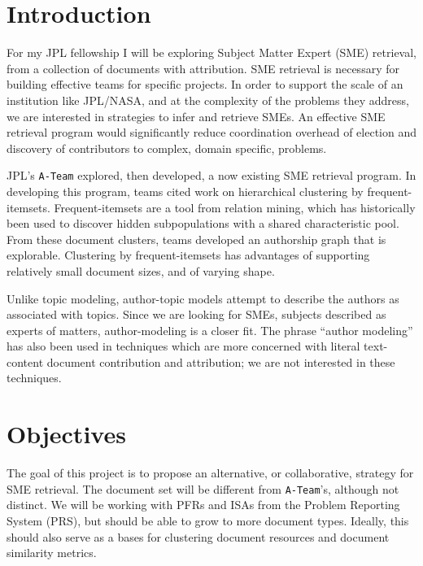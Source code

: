 \documentclass{article}
\begin{document}
\begin{multicols}{2}

\section{Introduction}

For my JPL fellowship I will be exploring Subject Matter Expert (SME) retrieval,
from a collection of documents with attribution. SME retrieval is necessary for
building effective teams for specific projects. In order to support the scale of an
institution like JPL/NASA, and at the complexity of the problems they address, we are
interested in strategies to infer and retrieve SMEs. An effective SME retrieval program
would significantly reduce coordination overhead of election and discovery of
contributors to complex, domain specific, problems.

JPL's \texttt{A-Team} explored, then developed, a now existing SME retrieval program.
In developing this program, teams cited work on hierarchical clustering by
frequent-itemsets\cite{wang2003,kiran2010}. Frequent-itemsets\cite{Agrawal1993} are a
tool from relation mining, which has historically been used to discover hidden
subpopulations with a shared characteristic pool. From these document clusters, teams
developed an authorship graph that is explorable. Clustering by frequent-itemsets has
advantages of supporting relatively small document sizes, and of varying shape.

Unlike topic modeling, author-topic models attempt to describe the authors as
associated with topics. Since we are looking for SMEs, subjects described as experts of
matters, author-modeling is a closer fit. The phrase ``author modeling'' has also been used
in techniques which are more concerned with literal text-content document
contribution and attribution\cite{Rexha2018}; we are not interested in these techniques.

\section{Objectives}

The goal of this project is to propose an alternative, or collaborative, strategy for
SME retrieval. The document set will be different from \texttt{A-Team}'s, although
not distinct. We will be working with PFRs and ISAs from the Problem Reporting System
(PRS), but should be able to grow to more document types. Ideally, this should also
serve as a bases for clustering document resources and document similarity metrics.


\end{multicols}
\end{document}
